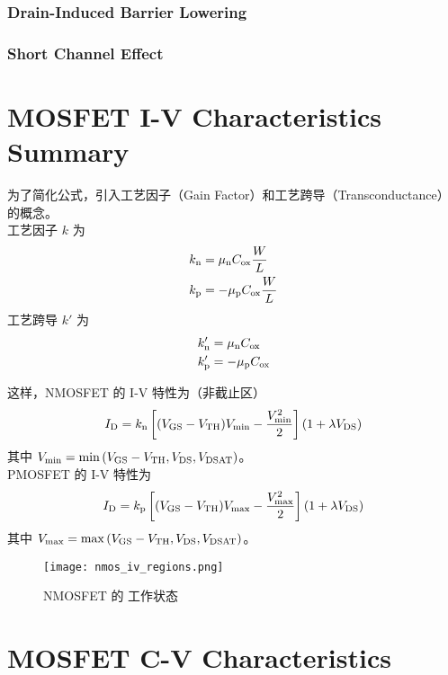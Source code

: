 \subsubsection{Drain-Induced Barrier Lowering}

\subsubsection{Short Channel Effect}

\section{MOSFET I-V Characteristics Summary}

为了简化公式，引入工艺因子（Gain Factor）和工艺跨导（Transconductance）的概念。\\
工艺因子 $k$ 为
\begin{equation}
    \begin{aligned}
        k_{\rm{n}} &= \mu_{\rm{n}} C_{\rm{ox}} \frac{W}{L} \\
        k_{\rm{p}} &= -\mu_{\rm{p}} C_{\rm{ox}} \frac{W}{L}
    \end{aligned}
\end{equation}
工艺跨导 $k'$ 为
\begin{equation}
    \begin{aligned}
        k'_{\rm{n}} &= \mu_{\rm{n}} C_{\rm{ox}} \\
        k'_{\rm{p}} &= -\mu_{\rm{p}} C_{\rm{ox}}
    \end{aligned}
\end{equation}

这样，NMOSFET 的 I-V 特性为（非截止区）
\begin{equation}
    I_{\rm{D}} = k_{\rm{n}} \left[ (V_{\rm{GS}} - V_{\rm{TH}}) V_{\rm{min}} - \frac{V_{\rm{min}}^2}{2} \right] \left(1 + \lambda V_{\rm{DS}}\right)
\end{equation}
其中 $V_{\rm{min}} = \min \left(V_{\rm{GS}} - V_{\rm{TH}}, V_{\rm{DS}}, V_{\rm{DSAT}}\right)$。\\
PMOSFET 的 I-V 特性为
\begin{equation}
    I_{\rm{D}} = k_{\rm{p}} \left[ (V_{\rm{GS}} - V_{\rm{TH}}) V_{\rm{max}} - \frac{V_{\rm{max}}^2}{2} \right] \left(1 + \lambda V_{\rm{DS}}\right)
\end{equation}
其中 $V_{\rm{max}} = \max \left(V_{\rm{GS}} - V_{\rm{TH}}, V_{\rm{DS}}, V_{\rm{DSAT}}\right)$。

\begin{figure}
    \centering
    \texttt{[image: nmos\_iv\_regions.png]}
    \caption{NMOSFET 的 工作状态}
    \label{fig:nmos_iv_regions}
\end{figure}

\section{MOSFET C-V Characteristics}
